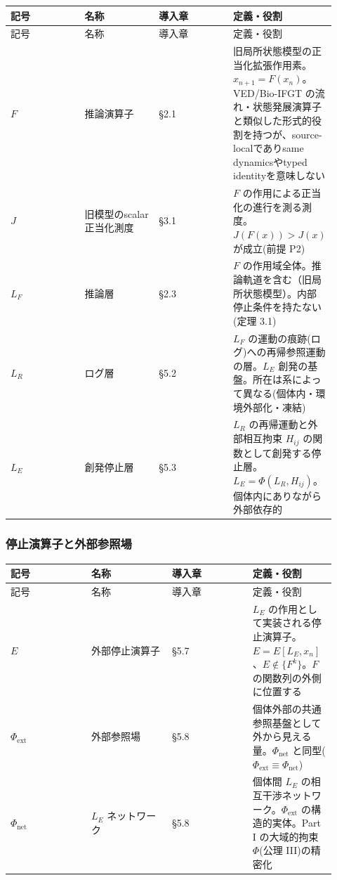 \begin{longtable}{@{}p{0.23\linewidth}p{0.23\linewidth}p{0.23\linewidth}p{0.23\linewidth}@{}}
\toprule
記号 & 名称 & 導入章 & 定義・役割 \\
\midrule
\endfirsthead
\toprule
記号 & 名称 & 導入章 & 定義・役割 \\
\midrule
\endhead
$F$ & 推論演算子 & \S{}2.1 & 旧局所状態模型の正当化拡張作用素。$x_{n+1} = F(x_n)$。VED/Bio-IFGT の流れ・状態発展演算子と類似した形式的役割を持つが、source-localでありsame dynamicsやtyped identityを意味しない \\
$J$ & 旧模型のscalar正当化測度 & \S{}3.1 & $F$ の作用による正当化の進行を測る測度。$J(F(x)) > J(x)$ が成立(前提 P2) \\
$L_F$ & 推論層 & \S{}2.3 & $F$ の作用域全体。推論軌道を含む（旧局所状態模型）。内部停止条件を持たない(定理 3.1) \\
$L_R$ & ログ層 & \S{}5.2 & $L_F$ の運動の痕跡(ログ)への再帰参照運動の層。$L_E$ 創発の基盤。所在は系によって異なる(個体内・環境外部化・凍結) \\
$L_E$ & 創発停止層 & \S{}5.3 & $L_R$ の再帰運動と外部相互拘束 $H_{ij}$ の関数として創発する停止層。$L_E = \Phi(L_R, H_{ij})$。個体内にありながら外部依存的 \\
\bottomrule
\end{longtable}


\subsubsection{停止演算子と外部参照場}


\begin{longtable}{@{}p{0.23\linewidth}p{0.23\linewidth}p{0.23\linewidth}p{0.23\linewidth}@{}}
\toprule
記号 & 名称 & 導入章 & 定義・役割 \\
\midrule
\endfirsthead
\toprule
記号 & 名称 & 導入章 & 定義・役割 \\
\midrule
\endhead
$E$ & 外部停止演算子 & \S{}5.7 & $L_E$ の作用として実装される停止演算子。$E = E[L_E, x_n]$、$E \notin \{F^k\}$。$F$ の関数列の外側に位置する \\
$\Phi_{\text{ext}}$ & 外部参照場 & \S{}5.8 & 個体外部の共通参照基盤として外から見える量。$\Phi_{\text{net}}$ と同型($\Phi_{\text{ext}} \equiv \Phi_{\text{net}}$) \\
$\Phi_{\text{net}}$ & $L_E$ ネットワーク & \S{}5.8 & 個体間 $L_E$ の相互干渉ネットワーク。$\Phi_{\text{ext}}$ の構造的実体。Part I の大域的拘束 $\Phi$(公理 III)の精密化 \\
\bottomrule
\end{longtable}


